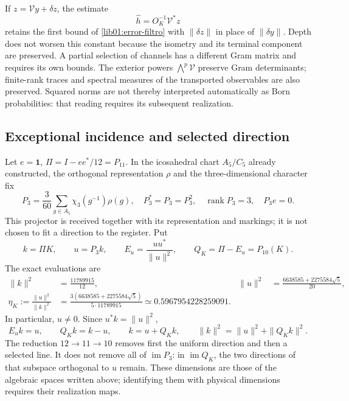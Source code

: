 If \(z=\mathcal Vy+\delta z\), the estimate
\[
 \widehat h=O_K^{-1}\mathcal V^*z
\]
retains the first bound of \eqref{lib01:error-filtro} with \(\|\delta z\|\) in place of \(\|\delta y\|\). Depth does not worsen this constant because the isometry and its terminal component are preserved. A partial selection of channels has a different Gram matrix and requires its own bounds. The exterior powers \(\bigwedge^p\mathcal V\) preserve Gram determinants; finite-rank traces and spectral measures of the transported observables are also preserved. Squared norms are not thereby interpreted automatically as Born probabilities: that reading requires its subsequent realization.

\subsection{Exceptional incidence and selected direction}
\label{lib01:direccion}

Let \(e=\mathbf1\), \(\Pi=I-ee^*/12=P_{11}\). In the icosahedral chart \(A_5/C_5\) already constructed, the orthogonal representation \(\rho\) and the three-dimensional character fix
\begin{equation}
 P_3=\frac3{60}\sum_{g\in A_5}\chi_3(g^{-1})\rho(g),
 \quad P_3^*=P_3=P_3^2,\quad
 \operatorname{rank}P_3=3,\quad P_3e=0.
 \label{lib01:P3}
\end{equation}
This projector is received together with its representation and markings; it is not chosen to fit a direction to the register. Put
\[
 k=\Pi K,\qquad u=P_3k,\qquad
 E_u=\frac{uu^*}{\|u\|^2},\qquad Q_K=\Pi-E_u=P_{10}(K).
\]
The exact evaluations are
\begin{align}
 \|k\|^2&=\frac{11789915}{12},&
 \|u\|^2&=\frac{6638585+2275584\sqrt5}{20},
 \label{lib01:normas-direccion}\\
 \eta_K:=\frac{\|u\|^2}{\|k\|^2}
 &=\frac{3(6638585+2275584\sqrt5)}{5\cdot11789915}
 \simeq0.5967954228259091.
 \label{lib01:eta}
\end{align}
In particular, \(u\ne0\). Since \(u^*k=\|u\|^2\),
\begin{equation}
 E_uk=u,\qquad Q_Kk=k-u,\qquad
 k=u+Q_Kk,\qquad \|k\|^2=\|u\|^2+\|Q_Kk\|^2.
 \label{lib01:particion-direccion}
\end{equation}
The reduction \(12\to11\to10\) removes first the uniform direction and then a selected line. It does not remove all of \(\operatorname{im}P_3\): in \(\operatorname{im}Q_K\), the two directions of that subspace orthogonal to \(u\) remain. These dimensions are those of the algebraic spaces written above; identifying them with physical dimensions requires their realization maps.


